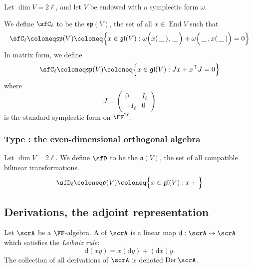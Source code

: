 \documentclass{article}
\newcommand*\wc{{\mkern 3mu\_\mkern 3mu}}
\DeclareMathOperator{\End}{End}
\DeclareMathOperator{\Der}{Der}
\newcommand{\dd}{\ensuremath{\text{d}}}
\newcommand{\glalg}{\ensuremath{\mathfrak{gl}}}
\newcommand{\spalg}{\ensuremath{\mathfrak{sp}}}
\newcommand{\oalg}{\ensuremath{\mathfrak{o}}}
\begin{document}
\begin{definition}
    Let $\dim V = 2\ell$, and let $V$ be endowed with a symplectic form $\omega$.

    We define $\sfC_\ell$ to be the  $\spalg(V)$, the set of all $x \in \End V$ such that
    \[
        \sfC_\ell
        \coloneq
        \spalg(V)
        \coloneq
        \Big\{
            x \in \glalg(V)
            :
            \omega\Big(x(\wc),\wc\Big)
            + \omega\Big(\wc,x(\wc)\Big)
            =
            0
        \Big\}
    \]
    In matrix form, we define
    \[
        \sfC_\ell
        \coloneq
        \spalg(V)
        \coloneq
        \Big\{
            x \in \glalg(V)
            :
            Jx + x^\top J = 0
        \Big\}
    \]
    where
    \[
        J
        =
        \begin{pmatrix}
            0 & I_\ell \\
            -I_\ell & 0
        \end{pmatrix}
    \]
    is the standard symplectic form on $\FF^{2\ell}$.
\end{definition}

\subsubsection{Type \sfD: the even-dimensional orthogonal algebra}

\begin{definition}
    Let $\dim V = 2\ell$.
    We define $\sfD$ to be the  $\oalg(V)$, the set of all compatible bilinear transformations.
    \[
        \sfD_\ell
        \coloneq
        \oalg(V)
        \coloneq
        \Big\{
            x \in \glalg(V)
            :
            x + 
        \Big\}
    \]
\end{definition}

\subsection{Derivations, the adjoint representation}

\begin{definition}
    Let $\scrA$ be a $\FF$-algebra.
    A  of $\scrA$ is a linear map $\dd: \scrA \to \scrA$ which satisfies the \textit{Leibniz rule}:
    \[
        \dd(xy)
        =
        x(\dd y) + (\dd x) y.
    \]
    The collection of all derivations of $\scrA$ is denoted $\Der \scrA$.
\end{definition}
\end{document}
